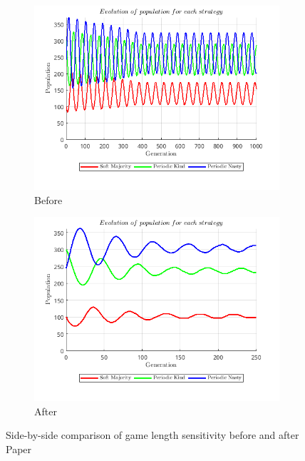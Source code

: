 \documentclass[12pt]{report}
\begin{document}
\begin{figure}[H]
    \centering
    \begin{subfigure}[t]{0.45\textwidth}
        \centering
        \includegraphics[width=\textwidth]{game_length_sensitivity_before_paper.png}
        \caption{Before}
    \end{subfigure}
    \hfill
    \begin{subfigure}[t]{0.45\textwidth}
        \centering
        \includegraphics[width=\textwidth]{game_length_sensitivity_after_paper.png}
        \caption{After}
    \end{subfigure}
    \caption{Side-by-side comparison of game length sensitivity before and after Paper}
\end{figure}
\end{document}
